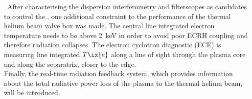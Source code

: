 %
        \,\newline%
        After characterising the dispersion interferometry and filterscopes as candidates to control the , one additional constraint to the performance of the thermal helium beam valve box was made. The central line integrated electron temperature needs to be above \SI{2}{\kilo\electronvolt} in order to avoid poor ECRH coupling and therefore radiation collapses. The electron cyclotron diagnostic (ECE) is measuring line integrated $T\ix{e}$ along a line of sight through the plasma core and along the separatrix, closer to the edge\cite{Krychowiak2021,Hirsch2019,Marushchenko2006}.\\%
        Finally, the real-time radiation feedback system, which provides information about the total radiative power loss of the plasma to the thermal helium beam, will be introduced.%
%
